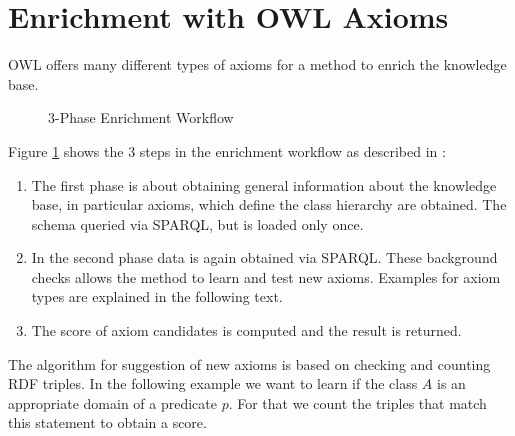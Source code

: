 \section{Enrichment with OWL Axioms}
OWL offers many different types of axioms for a method to enrich the knowledge
base. 
\begin{figure}
\label{3-Phase}
\centering
{}
\caption{3-Phase Enrichment Workflow\cite{paper2}}
\end{figure}
Figure \ref{3-Phase} shows the 3 steps in the enrichment workflow as described
in \cite{paper2}:
\begin{enumerate}
  \item The first phase is about obtaining general information about the
  knowledge base, in particular axioms, which define the class hierarchy are
  obtained. The schema queried via SPARQL, but is loaded only once.
  \item In the second phase data is again obtained via SPARQL. These background
  checks allows the method to learn and test new axioms. Examples for axiom
  types are explained in the following text.
  \item The score of axiom candidates is computed and the result is returned.
\end{enumerate}

The algorithm for suggestion of new axioms is based on checking and counting RDF
triples. In the following example we want to learn if the class $A$ is an
appropriate domain of a predicate $p$. For that we count the triples that match
this statement to obtain a score. 

